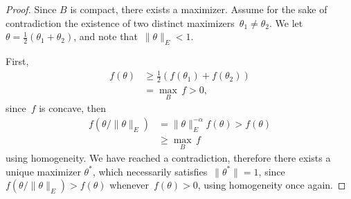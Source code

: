 \documentclass[10pt,a4paper]{amsart}
\begin{document}
\begin{proof}
    Since $B$ is compact, there exists a maximizer. Assume for the sake of contradiction the existence of two distinct maximizers~$\theta_1\neq \theta_2$.
    We let~$\theta = \frac12(\theta_1+\theta_2)$, and note that~$\|\theta\|_E<1$.

    First,
    \begin{equation}
        \begin{aligned}
            f\left(\theta\right)&\geq \frac12\left(f(\theta_1)+f(\theta_2)\right)\\
            &=\max_B\,f>0,
        \end{aligned}
    \end{equation}
    since~$f$ is concave, then
    \begin{equation}
        \begin{aligned}
        f(\theta/\|\theta\|_{E})&=\|\theta\|^{-\alpha}_{E}f(\theta)>f(\theta)\\
        &\geq \max_B\,f
        \end{aligned}
    \end{equation}
    using homogeneity. We have reached a contradiction, therefore there exists a unique maximizer $\theta^*$, which necessarily satisfies~$\|\theta^*\|=1$, since~$f(\theta/\|\theta\|_E)>f(\theta)$ whenever~$f(\theta)>0$, using homogeneity once again.
\end{proof}
\end{document}
